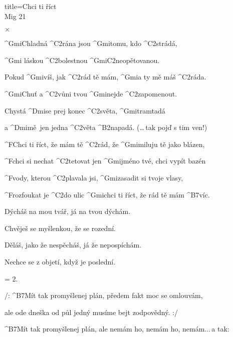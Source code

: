 \begin{song}{title=\predtitle\centering Chci ti říct \\\large Mig 21  \vspace*{-0.3cm}}  %
\begin{centerjustified}


$\times $

\sloka
	^{Gmi}Chladná ^{C2}rána jsou ^{Gmi}tomu, kdo ^{C2}strádá,

	^{Gmi\,\,}láskou ^{C2\z }bolestnou ^{Gmi\z C2}neopětovanou.

	Pokud ^{Gmi}víš, jak ^{C2}rád tě mám, ^{Gmi}a ty mě máš ^{C2}ráda.

	^{Gmi}Chuť a ^{C2}vůni tvou ^{Gmi}nejde ^{C2\z }zapomenout.

\sloka
	Chystá ^{Dmi}se prej konec ^{C2}světa, ^{Gmi}tramtadá

	a ^{Dmi\z}mě~jen jedna ^{C2}věta ^{\z B2}napadá. (\dots\,tak pojď s tim ven!)

	^{F}Chci ti říct, že mám tě ^{C2}rád, že ^{Gmi}miluju tě jako blázen,

	^{F}chci si nechat ^{C2\z }tetovat jen ^{Gmi}jméno tvé, chci vypít bazén

	^{F}vody, kterou ^{C2\z }plavala jsi, ^{Gmi\z }zasadit si tvoje vlasy,

	^{F\z }rozfoukat je ^{C2}do ulic ^{Gmi}chci ti říct, že rád tě mám ^{B7}víc.

\sloka
	Dýcháš na mou tvář, já na tvou dýchám.

	Chvěješ se myšlenkou, že se rozední.

	Děláš, jako že nespěcháš, já že nepospíchám.

	Nechce se z objetí, když je poslední.

\sloka  = 2.



\sloka
	/: ^{B7}Mít tak promyšlenej plán, předem fakt moc se omlouvám, 

	ale ode dneška od půl jedný musíme bejt zodpovědný. :/

	^{B7}Mít tak promyšlenej plán, ale nemám ho, nemám ho, nemám\elipsa.\elipsa.\elipsa.\,a tak:



\end{centerjustified}
\setcounter{Slokočet}{0}
\end{song}
